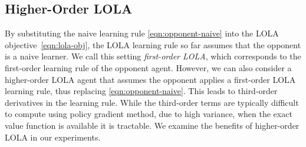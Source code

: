 \subsection{Higher-Order LOLA} \label{sec:higher-oder-lola}
By substituting the naive learning rule \eqref{eqn:opponent-naive} into the LOLA objective~\eqref{eqn:lola-obj}, the LOLA learning rule so far assumes that the opponent is a naive learner. We call this setting \emph{first-order LOLA}, which corresponds to the first-order learning rule of the opponent agent. However, we can also consider a higher-order LOLA agent that assumes the opponent applies a first-order LOLA learning rule, thus replacing \eqref{eqn:opponent-naive}. This leads to third-order derivatives in the learning rule. While the third-order terms are typically difficult to compute using policy gradient method, due to high variance, when the exact value function is available it is tractable. We examine the benefits of higher-order LOLA in our experiments.

